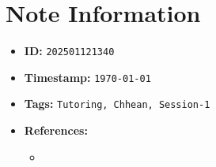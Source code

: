 \clearpage
{}
\label{202501121340}
\renewcommand{\notetitle}{Question 2}

\section*{Note Information}
\begin{itemize}
  \item \textbf{ID:} \texttt{202501121340}
  \item \textbf{Timestamp:} \texttt{\today \ \currenttime}
  \item \textbf{Tags:} \texttt{Tutoring, Chhean, Session-1}
  \item \textbf{References:}
    \begin{itemize}
      \item \href{}{}
    \end{itemize}
\end{itemize}


